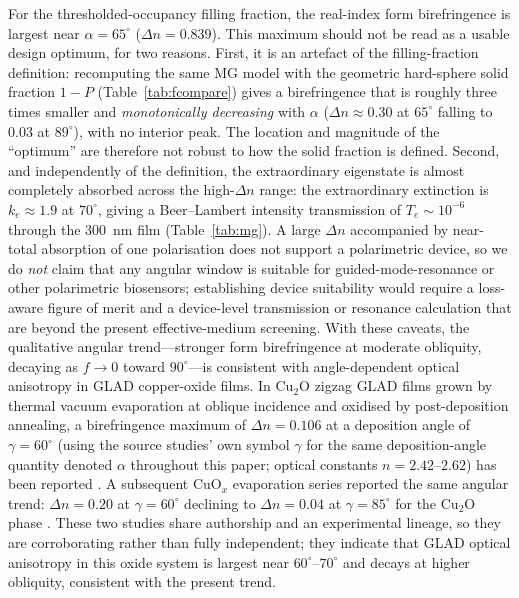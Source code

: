\documentclass[aip,amsmath,amssymb,reprint]{revtex4-1}
\newcommand{\dang}{\ensuremath{\alpha}}
\newcommand{\bsP}{\ensuremath{P}}
\begin{document}
For the thresholded-occupancy filling fraction, the real-index form
birefringence is largest near $\dang = 65^{\circ}$ ($\Delta n = 0.839$).
This maximum should not be read as a usable design optimum, for two
reasons.
First, it is an artefact of the filling-fraction definition: recomputing
the same MG model with the geometric hard-sphere solid fraction $1-\bsP$
(Table~\ref{tab:fcompare}) gives a birefringence that is roughly three
times smaller and \emph{monotonically decreasing} with $\dang$
($\Delta n \approx 0.30$ at $65^{\circ}$ falling to $0.03$ at $89^{\circ}$),
with no interior peak.  The location and magnitude of the
``optimum'' are therefore not robust to how the solid fraction is defined.
Second, and independently of the definition, the extraordinary eigenstate
is almost completely absorbed across the high-$\Delta n$ range: the
extraordinary extinction is $k_e \approx 1.9$ at $70^{\circ}$, giving a
Beer--Lambert intensity transmission of $T_e \sim 10^{-6}$ through the
\SI{300}{nm} film (Table~\ref{tab:mg}).  A large $\Delta n$ accompanied by
near-total absorption of one polarisation does not support a polarimetric
device, so we do \emph{not} claim that any angular window is suitable for
guided-mode-resonance or other polarimetric biosensors; establishing
device suitability would require a loss-aware figure of merit and a
device-level transmission or resonance calculation that are beyond the
present effective-medium screening.
With these caveats, the qualitative angular trend---stronger form
birefringence at moderate obliquity, decaying as $f \to 0$ toward
$90^{\circ}$---is consistent with angle-dependent optical anisotropy in
GLAD copper-oxide films.
In Cu$_2$O zigzag GLAD films grown by thermal vacuum evaporation at
oblique incidence and oxidised by post-deposition annealing, a
birefringence maximum of $\Delta n = 0.106$ at a deposition angle of
$\gamma = 60^{\circ}$ (using the source studies' own symbol $\gamma$ for
the same deposition-angle quantity denoted $\dang$ throughout this paper;
optical constants $n = 2.42$--$2.62$) has been reported
\citep{chaffar2018}.
A subsequent CuO$_x$ evaporation series reported the same angular trend:
$\Delta n = 0.20$ at $\gamma = 60^{\circ}$ declining to $\Delta n = 0.04$ at
$\gamma = 85^{\circ}$ for the Cu$_2$O phase \citep{chaffar2019}.
These two studies share authorship and an experimental lineage, so they are
corroborating rather than fully independent; they indicate that GLAD optical
anisotropy in this oxide system is largest near $60^{\circ}$--$70^{\circ}$ and
decays at higher obliquity, consistent with the present trend.
\end{document}
